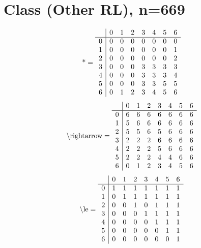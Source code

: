 \documentclass[11pt]{article}
\begin{document}
\section{Class (Other RL), n=669}
\[\text{*} = 
\begin{array}{r | r r r r r r r}
 & 0 & 1 & 2 & 3 & 4 & 5 & 6 \\ \hline
0 & 0 & 0 & 0 & 0 & 0 & 0 & 0 \\
1 & 0 & 0 & 0 & 0 & 0 & 0 & 1 \\
2 & 0 & 0 & 0 & 0 & 0 & 0 & 2 \\
3 & 0 & 0 & 0 & 3 & 3 & 3 & 3 \\
4 & 0 & 0 & 0 & 3 & 3 & 3 & 4 \\
5 & 0 & 0 & 0 & 3 & 3 & 5 & 5 \\
6 & 0 & 1 & 2 & 3 & 4 & 5 & 6 \\
\end{array}
\]
\[\text{\textbackslash rightarrow} = 
\begin{array}{r | r r r r r r r}
 & 0 & 1 & 2 & 3 & 4 & 5 & 6 \\ \hline
0 & 6 & 6 & 6 & 6 & 6 & 6 & 6 \\
1 & 5 & 6 & 6 & 6 & 6 & 6 & 6 \\
2 & 5 & 5 & 6 & 5 & 6 & 6 & 6 \\
3 & 2 & 2 & 2 & 6 & 6 & 6 & 6 \\
4 & 2 & 2 & 2 & 5 & 6 & 6 & 6 \\
5 & 2 & 2 & 2 & 4 & 4 & 6 & 6 \\
6 & 0 & 1 & 2 & 3 & 4 & 5 & 6 \\
\end{array}
\]
\[\text{\textbackslash le} = 
\begin{array}{r | r r r r r r r}
 & 0 & 1 & 2 & 3 & 4 & 5 & 6 \\ \hline
0 & 1 & 1 & 1 & 1 & 1 & 1 & 1 \\
1 & 0 & 1 & 1 & 1 & 1 & 1 & 1 \\
2 & 0 & 0 & 1 & 0 & 1 & 1 & 1 \\
3 & 0 & 0 & 0 & 1 & 1 & 1 & 1 \\
4 & 0 & 0 & 0 & 0 & 1 & 1 & 1 \\
5 & 0 & 0 & 0 & 0 & 0 & 1 & 1 \\
6 & 0 & 0 & 0 & 0 & 0 & 0 & 1 \\
\end{array}
\]
\end{document}

